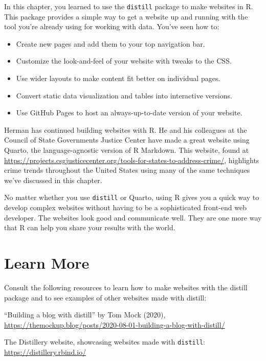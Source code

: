 \documentclass[
]{book}
\providecommand{\tightlist}{%
  \setlength{\itemsep}{0pt}\setlength{\parskip}{0pt}}
\begin{document}
In this chapter, you learned to use the \texttt{distill} package to make websites in R. This package provides a simple way to get a website up and running with the tool you're already using for working with data. You've seen how to:

\begin{itemize}
\tightlist
\item
  Create new pages and add them to your top navigation bar.
\item
  Customize the look-and-feel of your website with tweaks to the CSS.
\item
  Use wider layouts to make content fit better on individual pages.
\item
  Convert static data visualization and tables into interactive versions.
\item
  Use GitHub Pages to host an always-up-to-date version of your website.
\end{itemize}

Herman has continued building websites with R. He and his colleagues at the Council of State Governments Justice Center have made a great website using Quarto, the language-agnostic version of R Markdown. This website, found at \url{https://projects.csgjusticecenter.org/tools-for-states-to-address-crime/}, highlights crime trends throughout the United States using many of the same techniques we've discussed in this chapter.

No matter whether you use \texttt{distill} or Quarto, using R gives you a quick way to develop complex websites without having to be a sophisticated front-end web developer. The websites look good and communicate well. They are one more way that R can help you share your results with the world.

\hypertarget{learn-more-8}{%
\section*{Learn More}\label{learn-more-8}}

Consult the following resources to learn how to make websites with the distill package and to see examples of other websites made with distill:

``Building a blog with distill'' by Tom Mock (2020), \url{https://themockup.blog/posts/2020-08-01-building-a-blog-with-distill/}

The Distillery website, showcasing websites made with \texttt{distill}: \url{https://distillery.rbind.io/}
\end{document}
